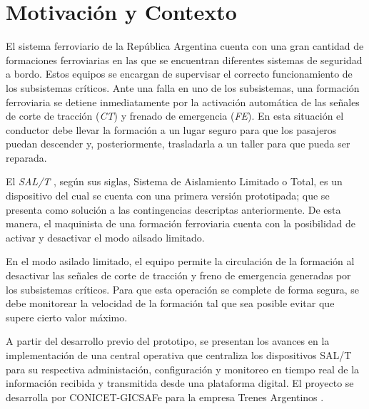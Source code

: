 
\section{Motivación y Contexto}

El sistema ferroviario de la República Argentina cuenta con una gran cantidad de formaciones ferroviarias en las que se encuentran diferentes sistemas de seguridad a bordo. Estos equipos se encargan de supervisar el correcto funcionamiento de los subsistemas críticos. Ante una falla en uno de los subsistemas, una formación ferroviaria se detiene inmediatamente por la activación automática de las señales de corte de tracción (\textit{CT}) y frenado de emergencia (\textit{FE}). En esta situación el conductor debe llevar la formación a un lugar seguro para que los pasajeros puedan descender y, posteriormente, trasladarla a un taller para que pueda ser reparada.

El \textit{SAL/T} \cite{b1}, según sus siglas, Sistema de Aislamiento Limitado o Total, es un dispositivo del cual se cuenta con una primera versión prototipada; que se presenta como solución a las contingencias descriptas anteriormente. De esta manera, el maquinista de una formación ferroviaria cuenta con la posibilidad de activar y desactivar el modo ailsado limitado.     

En el modo asilado limitado, el equipo permite la circulación de la formación al desactivar las señales de corte de tracción y freno de emergencia generadas por los subsistemas críticos. Para que esta operación se complete de forma segura, se debe monitorear la velocidad de la formación tal que sea posible evitar que supere cierto valor máximo.

A partir del desarrollo previo del prototipo, se presentan los avances en la implementación de una central operativa que centraliza los dispositivos SAL/T para su respectiva administación, configuración y monitoreo en tiempo real de la información recibida y transmitida desde una plataforma digital. El proyecto se desarrolla por CONICET-GICSAFe \cite{b2} para la empresa Trenes Argentinos \cite{b3}.
